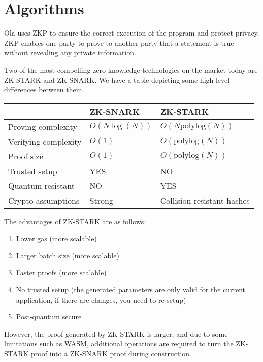 \section{Algorithms} \label{sec:algorithms}
Ola uses ZKP to ensure the correct execution of the program and protect privacy. ZKP enables one party to prove to another party that a statement is true without revealing any private information.

Two of the most compelling zero-knowledge technologies on the market today are ZK-STARK\cite{cryptoeprint:2018/046} and ZK-SNARK\cite{cryptoeprint:2011/443}. We have a table depicting some high-level differences between them.

\begin{table}[!ht]
    \centering
    \begin{tabular}{|l|l|l|}
        \hline
                            & ZK-SNARK    & ZK-STARK                   \\
        \hline
        Proving complexity   & $O(N\log(N))$ & $O(N\mathrm{polylog}(N))$            \\
        \hline
        Verifying complexity & $O(1)$        & $O(\mathrm{polylog}(N))$              \\
        \hline
        Proof size           & $O(1)$        & $O(\mathrm{polylog}(N))$              \\
        \hline
        Trusted setup        & YES         & NO                         \\
        \hline
        Quantum resistant    & NO          & YES                        \\
        \hline
        Crypto assumptions   & Strong      & Collision resistant hashes \\
        \hline
    \end{tabular}
\end{table}

\noindent The advantages of ZK-STARK are as follows:
\begin{enumerate}
    \item Lower gas (more scalable)
    \item Larger batch size (more scalable)
    \item Faster proofs (more scalable)
    \item No trusted setup (the generated parameters are only valid for the current application, if there are changes, you need to re-setup)
    \item Post-quantum secure
\end{enumerate}

However, the proof generated by ZK-STARK is larger, and due to some limitations such as WASM, additional operations are required to turn the ZK-STARK proof into a ZK-SNARK proof during construction.
    






